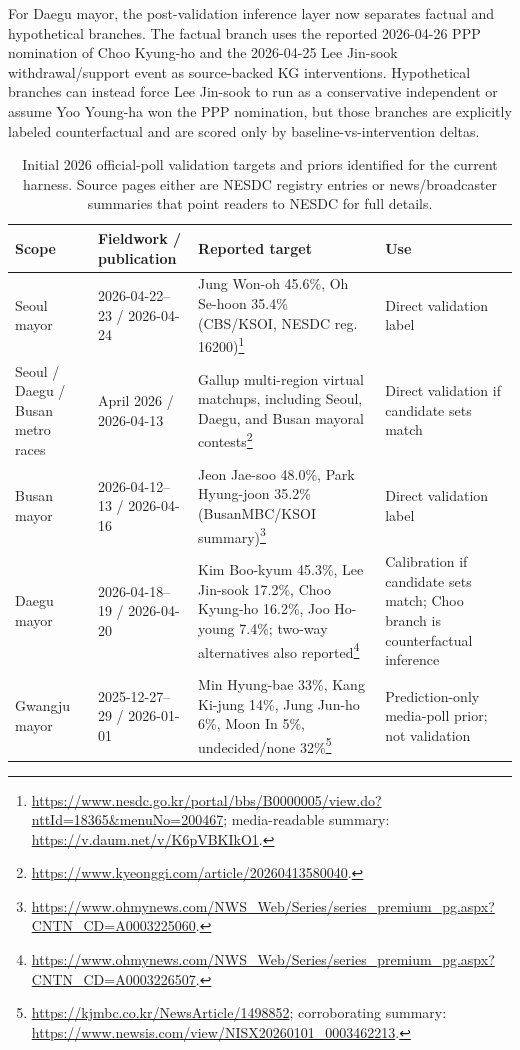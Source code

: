 \documentclass[11pt]{article}
\begin{document}
For Daegu mayor, the post-validation inference layer now separates factual and hypothetical branches. The factual branch uses the reported 2026-04-26 PPP nomination of Choo Kyung-ho and the 2026-04-25 Lee Jin-sook withdrawal/support event as source-backed KG interventions. Hypothetical branches can instead force Lee Jin-sook to run as a conservative independent or assume Yoo Young-ha won the PPP nomination, but those branches are explicitly labeled counterfactual and are scored only by baseline-vs-intervention deltas.

\begin{table}[h]
\centering
\caption{Initial 2026 official-poll validation targets and priors identified for the current harness. Source pages either are NESDC registry entries or news/broadcaster summaries that point readers to NESDC for full details.}
\label{tab:official-poll-targets}
\scriptsize
\setlength{\tabcolsep}{2.5pt}
\begin{tabularx}{\textwidth}{L{0.18\textwidth}L{0.18\textwidth}YL{0.16\textwidth}}
\toprule
Scope & Fieldwork / publication & Reported target & Use \\
\midrule
Seoul mayor & 2026-04-22--23 / 2026-04-24 & Jung Won-oh 45.6\%, Oh Se-hoon 35.4\% (CBS/KSOI, NESDC reg. 16200)\footnote{\url{https://www.nesdc.go.kr/portal/bbs/B0000005/view.do?nttId=18365&menuNo=200467}; media-readable summary: \url{https://v.daum.net/v/K6pVBKIkO1}.} & Direct validation label \\
Seoul / Daegu / Busan metro races & April 2026 / 2026-04-13 & Gallup multi-region virtual matchups, including Seoul, Daegu, and Busan mayoral contests\footnote{\url{https://www.kyeonggi.com/article/20260413580040}.} & Direct validation if candidate sets match \\
Busan mayor & 2026-04-12--13 / 2026-04-16 & Jeon Jae-soo 48.0\%, Park Hyung-joon 35.2\% (BusanMBC/KSOI summary)\footnote{\url{https://www.ohmynews.com/NWS_Web/Series/series_premium_pg.aspx?CNTN_CD=A0003225060}.} & Direct validation label \\
Daegu mayor & 2026-04-18--19 / 2026-04-20 & Kim Boo-kyum 45.3\%, Lee Jin-sook 17.2\%, Choo Kyung-ho 16.2\%, Joo Ho-young 7.4\%; two-way alternatives also reported\footnote{\url{https://www.ohmynews.com/NWS_Web/Series/series_premium_pg.aspx?CNTN_CD=A0003226507}.} & Calibration if candidate sets match; Choo branch is counterfactual inference \\
Gwangju mayor & 2025-12-27--29 / 2026-01-01 & Min Hyung-bae 33\%, Kang Ki-jung 14\%, Jung Jun-ho 6\%, Moon In 5\%, undecided/none 32\%\footnote{\url{https://kjmbc.co.kr/NewsArticle/1498852}; corroborating summary: \url{https://www.newsis.com/view/NISX20260101_0003462213}.} & Prediction-only media-poll prior; not validation \\

\end{tabularx}
\end{table}
\end{document}
